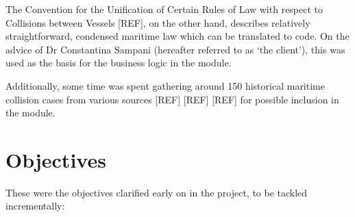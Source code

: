 The Convention for the Unification of Certain Rules of Law with respect to Collisions between Vessels [REF], on the other hand, describes relatively straightforward, condensed maritime law which can be translated to code. On the advice of Dr Constantina Sampani (hereafter referred to as `the client'), this was used as the basis for the business logic in the module. %

Additionally, some time was spent gathering around 150 historical maritime collision cases from various sources [REF] [REF] [REF] for possible inclusion in the module. %

\section{Objectives}

These were the objectives clarified early on in the project, to be tackled incrementally:

